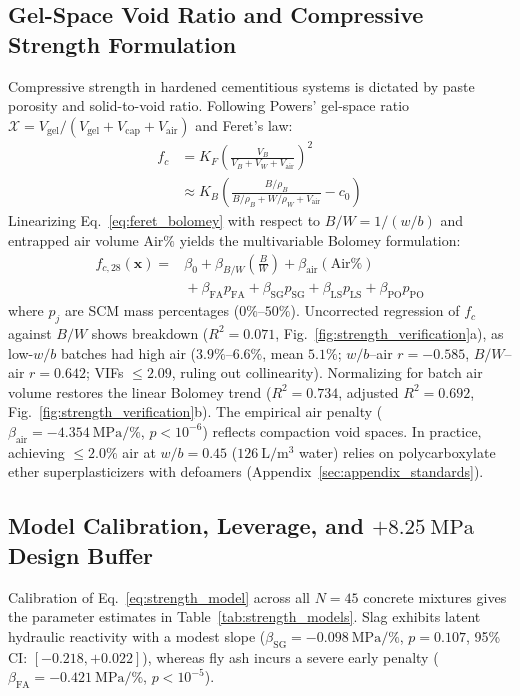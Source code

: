 \documentclass[journal]{IEEEtran}
\begin{document}
\subsection{Gel-Space Void Ratio and Compressive Strength Formulation}
Compressive strength in hardened cementitious systems is dictated by paste porosity and solid-to-void ratio. Following Powers' gel-space ratio $\mathcal{X} = V_{\mathrm{gel}} / (V_{\mathrm{gel}} + V_{\mathrm{cap}} + V_{\mathrm{air}})$ and Feret's law:
\begin{align}
f_c &= K_F \left( \frac{V_B}{V_B + V_W + V_{\mathrm{air}}} \right)^2 \nonumber \\
&\approx K_B \left( \frac{B/\rho_B}{B/\rho_B + W/\rho_W + V_{\mathrm{air}}} - c_0 \right)
\label{eq:feret_bolomey}
\end{align}
Linearizing Eq.~\ref{eq:feret_bolomey} with respect to $B/W = 1/(w/b)$ and entrapped air volume $\mathrm{Air}\%$ yields the multivariable Bolomey formulation:
\begin{align}
f_{c,28}(\mathbf{x}) ={}& \beta_0 + \beta_{B/W}\left(\frac{B}{W}\right) + \beta_{\mathrm{air}}(\mathrm{Air}\%) \nonumber \\
&{}+ \beta_{\mathrm{FA}} p_{\mathrm{FA}} + \beta_{\mathrm{SG}} p_{\mathrm{SG}} + \beta_{\mathrm{LS}} p_{\mathrm{LS}} + \beta_{\mathrm{PO}} p_{\mathrm{PO}}
\label{eq:strength_model}
\end{align}
where $p_j$ are SCM mass percentages ($0\%\text{--}50\%$). Uncorrected regression of $f_c$ against $B/W$ shows breakdown ($R^2 = 0.071$, Fig.~\ref{fig:strength_verification}a), as low-$w/b$ batches had high air ($3.9\%\text{--}6.6\%$, mean $5.1\%$; $w/b$--air $r = -0.585$, $B/W$--air $r = 0.642$; VIFs $\le 2.09$, ruling out collinearity). Normalizing for batch air volume restores the linear Bolomey trend ($R^2 = 0.734$, adjusted $R^2 = 0.692$, Fig.~\ref{fig:strength_verification}b). The empirical air penalty ($\beta_{\mathrm{air}} = -4.354\ \mathrm{MPa/\%}$, $p < 10^{-6}$) reflects compaction void spaces. In practice, achieving $\le 2.0\%$ air at $w/b = 0.45$ ($126\ \mathrm{L/m^3}$ water) relies on polycarboxylate ether superplasticizers with defoamers (Appendix~\ref{sec:appendix_standards}).

\subsection{\texorpdfstring{Model Calibration, Leverage, and $+8.25\ \mathrm{MPa}$ Design Buffer}{Model Calibration, Leverage, and +8.25 MPa Design Buffer}}
Calibration of Eq.~\ref{eq:strength_model} across all $N = 45$ concrete mixtures gives the parameter estimates in Table~\ref{tab:strength_models}. Slag exhibits latent hydraulic reactivity with a modest slope ($\beta_{\mathrm{SG}} = -0.098\ \mathrm{MPa/\%}$, $p = 0.107$, 95\% CI: $[-0.218, +0.022]$), whereas fly ash incurs a severe early penalty ($\beta_{\mathrm{FA}} = -0.421\ \mathrm{MPa/\%}$, $p < 10^{-5}$).
\end{document}
